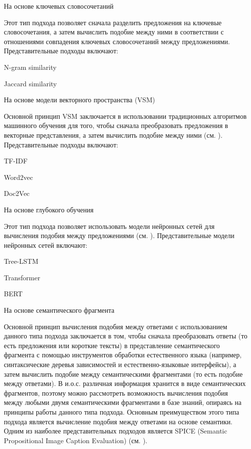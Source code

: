 \begin{textitemize}
	\item На основе ключевых словосочетаний
	
	Этот тип подхода позволяет сначала разделить предложения на ключевые словосочетания, а затем вычислить подобие между ними в соответствии с отношениями совпадения ключевых словосочетаний между предложениями. Представительные подходы включают:
	
	\begin{textitemize}
		\item N-gram similarity
		\item Jaccard similarity
	\end{textitemize}
	
	\item На основе модели векторного пространства (VSM)
	
	Основной принцип VSM заключается в использовании традиционных алгоритмов машинного обучения для того, чтобы сначала преобразовать предложения в векторные представления, а затем вычислить подобие между ними (см. ). Представительные подходы включают:
	
	\begin{textitemize}
		\item TF-IDF
		\item Word2vec
		\item Doc2Vec
	\end{textitemize}
	
	\item На основе глубокого обучения
	
	Этот тип подхода позволяет использовать модели нейронных сетей для вычисления подобия между предложениями (см. ). Представительные модели нейронных сетей включают:
	
	\begin{textitemize}
		\item Tree-LSTM
		\item Transformer
		\item BERT
	\end{textitemize}
	
	\item На основе семантического фрагмента
	
	Основной принцип вычисления подобия между ответами с использованием данного типа подхода заключается в том, чтобы сначала преобразовать ответы (то есть предложения или короткие тексты) в представление семантического фрагмента с помощью инструментов обработки естественного языка (например, синтаксические деревья зависимостей и естественно-языковые интерфейсы), а затем вычислить подобие между семантическими фрагментами (то есть подобие между ответами). В и.о.с. различная информация хранится в виде семантических фрагментов, поэтому можно рассмотреть возможность вычисления подобия между любыми двумя семантическими фрагментами в базе знаний, опираясь на принципы работы данного типа подхода. Основным преимуществом этого типа подхода является вычисление подобия между ответами на основе семантики. Одним из наиболее представительных подходов является SPICE (Semantic Propositional Image Caption Evaluation) (см. ). 
	

\end{textitemize}
